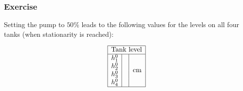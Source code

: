 \subsubsection{Exercise}

Setting the pump to $50\%$ leads to the following values for the levels on all four tanks (when stationarity is reached):

\setlength{\extrarowheight}{3pt}
$$
\begin{array}{|r|l|c|}
    \hline
    \multicolumn{3}{|c|}{\text{Tank level}} \\
    \hline
    h_1^0 & & \multirow{4}{*}{cm} \\
    h_2^0 & & \\
    h_3^0 & & \\
    h_4^0 & & \\
    \hline
\end{array}
$$
